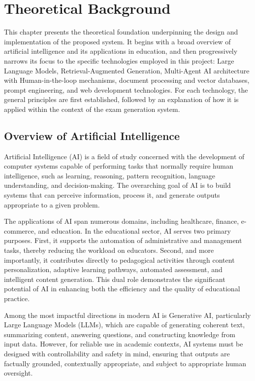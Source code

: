 \documentclass[12pt,a4paper]{article}
\begin{document}
\section{Theoretical Background}

This chapter presents the theoretical foundation underpinning the design and implementation of the proposed system. It begins with a broad overview of artificial intelligence and its applications in education, and then progressively narrows its focus to the specific technologies employed in this project: Large Language Models, Retrieval-Augmented Generation, Multi-Agent AI architecture with Human-in-the-loop mechanisms, document processing and vector databases, prompt engineering, and web development technologies. For each technology, the general principles are first established, followed by an explanation of how it is applied within the context of the exam generation system.

\subsection{Overview of Artificial Intelligence}

Artificial Intelligence (AI) is a field of study concerned with the development of computer systems capable of performing tasks that normally require human intelligence, such as learning, reasoning, pattern recognition, language understanding, and decision-making. The overarching goal of AI is to build systems that can perceive information, process it, and generate outputs appropriate to a given problem.

The applications of AI span numerous domains, including healthcare, finance, e-commerce, and education. In the educational sector, AI serves two primary purposes. First, it supports the automation of administrative and management tasks, thereby reducing the workload on educators. Second, and more importantly, it contributes directly to pedagogical activities through content personalization, adaptive learning pathways, automated assessment, and intelligent content generation. This dual role demonstrates the significant potential of AI in enhancing both the efficiency and the quality of educational practice.

Among the most impactful directions in modern AI is Generative AI, particularly Large Language Models (LLMs), which are capable of generating coherent text, summarizing content, answering questions, and constructing knowledge from input data. However, for reliable use in academic contexts, AI systems must be designed with controllability and safety in mind, ensuring that outputs are factually grounded, contextually appropriate, and subject to appropriate human oversight.
\end{document}
